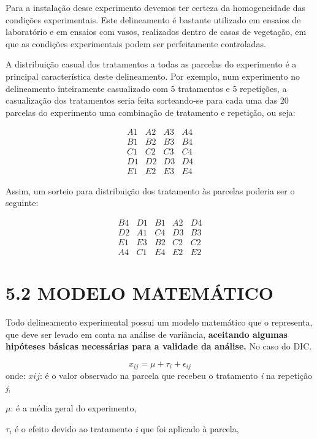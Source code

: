 \documentclass[
]{book}
\begin{document}
Para a instalação desse experimento devemos ter certeza da homogeneidade das condições experimentais. Este delineamento é bastante utilizado em ensaios de laboratório e em ensaios com vasos, realizados dentro de casas de vegetação, em que as condições experimentais podem ser perfeitamente controladas.

A distribuição casual dos tratamentos a todas as parcelas do experimento é a principal característica deste delineamento. Por exemplo, num experimento no delineamento inteiramente casualizado com 5 tratamentos e 5 repetições, a casualização dos tratamentos seria feita sorteando-se para cada uma das 20 parcelas do experimento uma combinação de tratamento e repetição, ou seja:

\[
\begin{matrix}
A1 & A2 & A3 & A4 \\
B1 & B2 & B3 & B4 \\
C1 & C2 & C3 & C4 \\
D1 & D2 & D3 & D4 \\
E1 & E2 & E3 & E4 
\end{matrix}
\]

Assim, um sorteio para distribuição dos tratamento às parcelas poderia ser o seguinte:

\[
\begin{matrix}
B4 & D1 & B1 & A2 & D4\\
D2 & A1 & C4 & D3 & B3\\
E1 & E3 & B2 & C2 & C2\\
A4 & C1 & E4 & E2 & E2
\end{matrix}
\]

\hypertarget{modelo-matemuxe1tico}{%
\chapter{5.2 MODELO MATEMÁTICO}\label{modelo-matemuxe1tico}}

Todo delineamento experimental possui um modelo matemático que o representa, que deve ser levado em conta na análise de variância, \textbf{aceitando algumas hipóteses básicas necessárias para a validade da análise.} No caso do DIC.

\[
x_{ij}= \mu + \tau_i + \epsilon_{ij}
\]
onde:
\(x{ij}\): é o valor observado na parcela que recebeu o tratamento \emph{i} na repetição \emph{j},

\(\mu\): é a média geral do experimento,

\(\tau_i\) é o efeito devido ao tratamento \emph{i} que foi aplicado à parcela,
\end{document}
